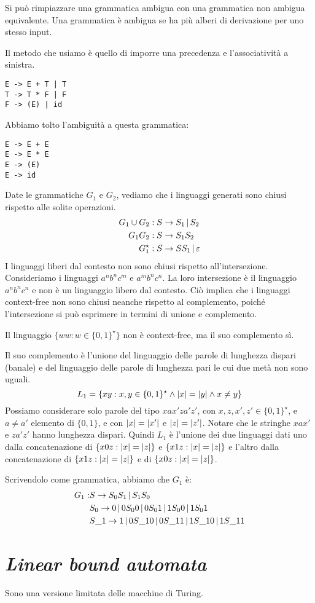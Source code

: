 Si pu\`o rimpiazzare una grammatica ambigua con una grammatica non ambigua equivalente.
Una grammatica \`e ambigua se ha pi\`u alberi di derivazione per uno stesso input.

Il metodo che usiamo \`e quello di imporre una precedenza e l'associativit\`a a sinistra.
\begin{verbatim}
E -> E + T | T 
T -> T * F | F
F -> (E) | id
\end{verbatim}
Abbiamo tolto l'ambiguit\`a a questa grammatica:
\begin{verbatim}
E -> E + E
E -> E * E
E -> (E)
E -> id
\end{verbatim}
Date le grammatiche $G_1$ e $G_2$, vediamo che i linguaggi generati sono chiusi rispetto alle solite operazioni.
\begin{align*}
	G_1 \cup G_2 & : S \to S_1 \, | \, S_2 \\
	G_1 G_2 & : S \to S_1 S_2 \\
	G_1^{\star} & : S \to S S_1 \, | \, \varepsilon
\end{align*}
I linguaggi liberi dal contesto non sono chiusi rispetto all'intersezione.
Consideriamo i linguaggi $a^n b^n c^m$ e $a^m b^n c^n$.
La loro intersezione \`e il linguaggio $a^n b^n c^n$ e non \`e un linguaggio libero dal contesto.
Ci\`o implica che i linguaggi context-free non sono chiusi neanche rispetto al complemento, poich\'e l'intersezione si pu\`o esprimere in termini di unione e complemento.

Il linguaggio $\{ ww : w \in \{0,1\}^{\star}\}$ non \`e context-free, ma il suo complemento s\`i.

Il suo complemento \`e l'unione del linguaggio delle parole di lunghezza dispari (banale) e del linguaggio delle parole di lunghezza pari le cui due met\`a non sono uguali.
\[
	L_1 = \{ xy : x,y \in \{0,1\}^{\star} \land \left\lvert{x}\right\rvert = \left\lvert{y}\right\rvert \land x \neq y \}
\]
Possiamo considerare solo parole del tipo $xax'za'z'$, con $x,z,x',z' \in \{0,1\}^{\star}$, e $a \neq a'$ elemento di $\{0,1\}$, e con $\left\lvert{x}\right\rvert = \left\lvert{x'}\right\rvert$ e $\left\lvert{z}\right\rvert = \left\lvert{z'}\right\rvert$.
Notare che le stringhe $xax'$ e $za'z'$ hanno lunghezza dispari.
Quindi $L_1$ \`e l'unione dei due linguaggi dati uno dalla concatenazione di $\{ x0z : \left\lvert{x}\right\rvert = \left\lvert{z}\right\rvert \}$ e $\{ x1z : \left\lvert{x}\right\rvert = \left\lvert{z}\right\rvert \}$ e l'altro dalla concatenazione di $\{ x1z : \left\lvert{x}\right\rvert = \left\lvert{z}\right\rvert \}$ e di $\{ x0z : \left\lvert{x}\right\rvert = \left\lvert{z}\right\rvert \}$.

Scrivendolo come grammatica, abbiamo che $G_1$ \`e:
\begin{align*}
G_1 :& S \to S_0 S_1 \, | \, S_1 S_0 \\
& S_0 \to 0 \, | \, 0 S_0 0 \, | \, 0 S_0 1 \, | \, 1 S_0 0 \, | \, 1 S_0 1 \\
& S\_1 \to 1 \, | \, 0 S\_1 0 \, | \, 0 S\_1 1 \, | \, 1 S\_1 0 \, | \, 1 S\_1 1 
\end{align*}

\section{\emph{Linear bound automata}}

Sono una versione limitata delle macchine di Turing.


